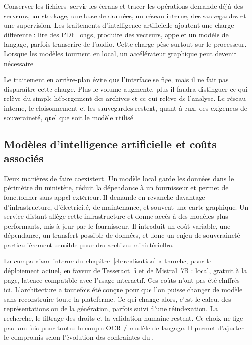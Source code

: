 Conserver les fichiers, servir les écrans et tracer les opérations demande déjà des serveurs, un stockage, une base de données, un réseau interne, des sauvegardes et une supervision. Les traitements d'intelligence artificielle ajoutent une charge différente : lire des PDF longs, produire des vecteurs, appeler un modèle de langage, parfois transcrire de l'audio. Cette charge pèse surtout sur le processeur. Lorsque les modèles tournent en local, un accélérateur graphique peut devenir nécessaire.

Le traitement en arrière-plan évite que l'interface se fige, mais il ne fait pas disparaître cette charge. Plus le volume augmente, plus il faudra distinguer ce qui relève du simple hébergement des archives et ce qui relève de l'analyse. Le réseau interne, le cloisonnement et les sauvegardes restent, quant à eux, des exigences de souveraineté, quel que soit le modèle utilisé.

\subsection{Modèles d'intelligence artificielle et coûts associés}

Deux manières de faire coexistent. Un modèle local garde les données dans le périmètre du ministère, réduit la dépendance à un fournisseur et permet de fonctionner sans appel extérieur. Il demande en revanche davantage d'infrastructure, d'électricité, de maintenance, et souvent une carte graphique. Un service distant allège cette infrastructure et donne accès à des modèles plus performants, mis à jour par le fournisseur. Il introduit un coût variable, une dépendance, un transfert possible de données, et donc un enjeu de souveraineté particulièrement sensible pour des archives ministérielles.

La comparaison interne du chapitre~\ref{ch:realisation} a tranché, pour le déploiement actuel, en faveur de Tesseract~5 et de Mistral~7B : local, gratuit à la page, latence compatible avec l'usage interactif. Ces coûts n'ont pas été chiffrés ici. L'architecture a toutefois été conçue pour que l'on puisse changer de modèle sans reconstruire toute la plateforme. Ce qui change alors, c'est le calcul des représentations ou de la génération, parfois suivi d'une réindexation. La recherche, le filtrage des droits et la validation humaine restent. Ce choix ne fige pas une fois pour toutes le couple OCR / modèle de langage. Il permet d'ajuster le compromis selon l'évolution des contraintes du \nomMinistere{}.

